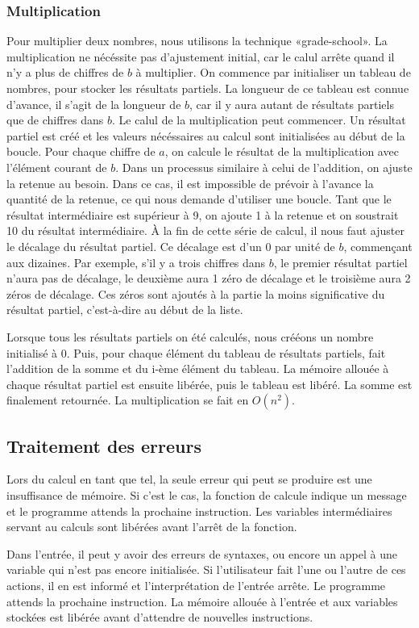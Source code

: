 \documentclass[letterpaper,12pt]{scrartcl}
\begin{document}
            \subsubsection{Multiplication}
             Pour multiplier deux nombres, nous utilisons la technique «grade-school». La multiplication ne nécéssite pas d'ajustement initial, car le calul arrête quand il n'y a plus de chiffres de $b$ à multiplier. On commence par initialiser un tableau de nombres, pour stocker les résultats partiels. La longueur de ce tableau est connue d'avance, il s'agit de la longueur de $b$, car il y aura autant de résultats partiels que de chiffres dans $b$. Le calul de la multiplication peut commencer. Un résultat partiel est créé et les valeurs nécéssaires au calcul sont initialisées au début de la boucle. Pour chaque chiffre de $a$, on calcule le résultat de la multiplication avec l'élément courant de $b$. Dans un processus similaire à celui de l'addition, on ajuste la retenue au besoin. Dans ce cas, il est impossible de prévoir à l'avance la quantité de la retenue, ce qui nous demande d'utiliser une boucle. Tant que le résultat intermédiaire est supérieur à 9, on ajoute 1 à la retenue et on soustrait 10 du résultat intermédiaire. À la fin de cette série de calcul, il nous faut ajuster le décalage du résultat partiel. Ce décalage est d'un 0 par unité de $b$, commençant aux dizaines. Par exemple, s'il y a trois chiffres dans $b$, le premier résultat partiel n'aura pas de décalage, le deuxième aura 1 zéro de décalage et le troisième aura 2 zéros de décalage. Ces zéros sont ajoutés à la partie la moins significative du résultat partiel, c'est-à-dire au début de la liste. 

             Lorsque tous les résultats partiels on été calculés, nous crééons un nombre initialisé à 0. Puis, pour chaque élément du tableau de résultats partiels, fait l'addition de la somme et du i-ème élément du tableau. La mémoire allouée à chaque résultat partiel est ensuite libérée, puis le tableau est libéré. La somme est finalement retournée. La multiplication se fait en $O(n^2)$.
            
        
        \subsection{Traitement des erreurs}
         Lors du calcul en tant que tel, la seule erreur qui peut se produire est une insuffisance de mémoire. Si c'est le cas, la fonction de calcule indique un message et le programme attends la prochaine instruction. Les variables intermédiaires servant au calculs sont libérées avant l'arrêt de la fonction.

         Dans l'entrée, il peut y avoir des erreurs de syntaxes, ou encore un appel à une variable qui n'est pas encore initialisée. Si l'utilisateur fait l'une ou l'autre de ces actions, il en est informé et l'interprétation de l'entrée arrête. Le programme attends la prochaine instruction. La mémoire allouée à l'entrée et aux variables stockées est libérée avant d'attendre de nouvelles instructions. 
		
\end{document}
